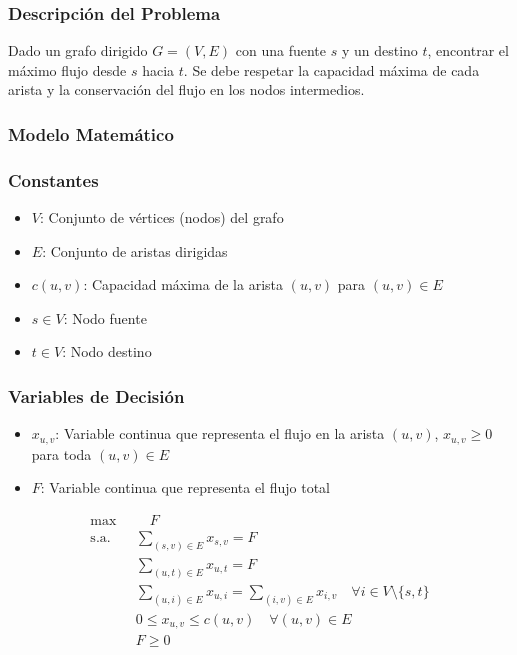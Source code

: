 \documentclass[12pt]{article}
\begin{document}
\subsubsection{Descripción del Problema}

Dado un grafo dirigido $G = (V, E)$ con una fuente $s$ y un destino $t$, encontrar el máximo flujo desde $s$ hacia $t$. Se debe respetar la capacidad máxima de cada arista y la conservación del flujo en los nodos intermedios.

\subsubsection{Modelo Matemático}

\subsubsection*{Constantes}

\begin{itemize}
    \item $V$: Conjunto de vértices (nodos) del grafo
    \item $E$: Conjunto de aristas dirigidas
    \item $c(u,v)$: Capacidad máxima de la arista $(u,v)$ para $(u,v) \in E$
    \item $s \in V$: Nodo fuente
    \item $t \in V$: Nodo destino
\end{itemize}

\subsubsection*{Variables de Decisión}

\begin{itemize}
    \item $x_{u,v}$: Variable continua que representa el flujo en la arista $(u,v)$, $x_{u,v} \geq 0$ para toda $(u,v) \in E$
    \item $F$: Variable continua que representa el flujo total
\end{itemize}

\begin{align*}
  \max & \quad F \\
  \text{s.a.} \quad
    & \sum_{(s,v) \in E} x_{s,v} = F \\
    & \sum_{(u,t) \in E} x_{u,t} = F \\
    & \sum_{(u,i) \in E} x_{u,i} = \sum_{(i,v) \in E} x_{i,v} \quad \forall i \in V \setminus \{s,t\} \\
    & 0 \leq x_{u,v} \leq c(u,v) \quad \forall (u,v) \in E \\
    & F \geq 0
\end{align*}
\end{document}
